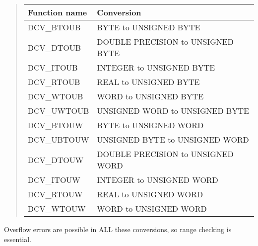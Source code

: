 \documentclass[twoside,11pt,nolof]{starlink}
\begin{document}
\begin{quote}
\begin{tabular}{ll}
\textbf{Function name}     &\textbf{Conversion}\\
\hline
DCV\_BTOUB  &BYTE to UNSIGNED BYTE \\
DCV\_DTOUB  &DOUBLE PRECISION to UNSIGNED BYTE \\
DCV\_ITOUB  &INTEGER to UNSIGNED BYTE \\
DCV\_RTOUB  &REAL to UNSIGNED BYTE \\
DCV\_WTOUB  &WORD to UNSIGNED BYTE \\
DCV\_UWTOUB &UNSIGNED WORD to UNSIGNED BYTE \\
DCV\_BTOUW  &BYTE to UNSIGNED WORD \\
DCV\_UBTOUW &UNSIGNED BYTE to UNSIGNED WORD \\
DCV\_DTOUW  &DOUBLE PRECISION to UNSIGNED WORD \\
DCV\_ITOUW  &INTEGER to UNSIGNED WORD \\
DCV\_RTOUW  &REAL to UNSIGNED WORD \\
DCV\_WTOUW  &WORD to UNSIGNED WORD \\
\end{tabular}
\end{quote}

Overflow errors are possible in ALL these conversions, so range checking is
essential.
\end{document}

